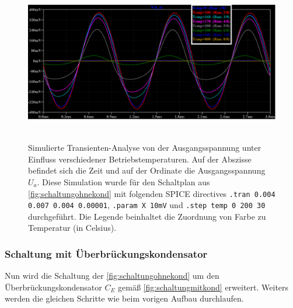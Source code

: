 \documentclass[12pt,english,ngerman]{scrartcl}
\begin{document}
\begin{figure}[H]
  \centering
    \includegraphics[width=\linewidth, height=7cm]{./figures/ohnekond/tempsweepausgang.png }
    \caption[Simulierte Transienten-Analyse ohne
    Überbrückungskondensator]{Simulierte Transienten-Analyse von der
      Ausgangsspannung unter Einfluss verschiedener Betriebstemperaturen. Auf
      der Abszisse befindet sich die Zeit und auf der Ordinate die
      Ausgangsspannung $U_a$. Diese Simulation wurde für den Schaltplan aus
    \autoref{fig:schaltungohnekond} mit folgenden SPICE directives \texttt{.tran 0.004 0.007 0.004 0.00001}, \texttt{.param X 10mV} und \texttt{.step temp 0 200 30} durchgeführt. Die Legende
    beinhaltet die Zuordnung von Farbe zu Temperatur (in Celsius).}
  \label{fig:sim_tran_temp_ohne}
\end{figure}


\subsubsection{Schaltung mit Überbrückungskondensator} \label{sec:Schaltung mit Überbückungskondensator}

Nun wird die Schaltung der  \autoref{fig:schaltungohnekond} um den
Überbrückungskondensator $C_E$ gemäß  \autoref{fig:schaltungmitkond}
erweitert. Weiters werden die gleichen Schritte wie beim vorigen Aufbau
durchlaufen.
\end{document}
